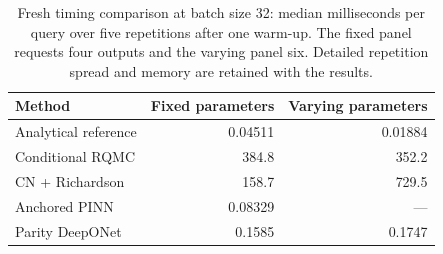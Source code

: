\begin{table}[!ht]\centering\small
\caption{Fresh timing comparison at batch size 32: median milliseconds per query over five repetitions after one warm-up. The fixed panel requests four outputs and the varying panel six. Detailed repetition spread and memory are retained with the results.}
\label{tab:fresh-timing}
\begin{tabular}{lrr}\toprule
Method & Fixed parameters & Varying parameters\\\midrule
Analytical reference & 0.04511 & 0.01884\\
Conditional RQMC & 384.8 & 352.2\\
CN + Richardson & 158.7 & 729.5\\
Anchored PINN & 0.08329 & ---\\
Parity DeepONet & 0.1585 & 0.1747\\
\bottomrule\end{tabular}\end{table}
